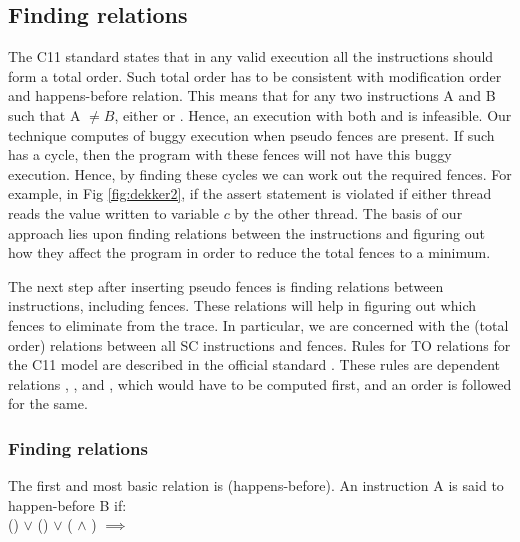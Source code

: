 \subsection{Finding relations}
The C11 standard \cite{c11} states that in any valid execution 
all the \mosc instructions should form a total order. Such total order
has to be consistent with modification order and 
happens-before relation. This means that for any two \mosc instructions A 
and B such that A $ \neq B $, either  or . 
Hence, an execution with both  and  is infeasible.
Our technique computes \setTO of buggy execution when pseudo fences are 
present. If such \setTO has a cycle, then the program with these fences 
will not have this buggy execution. 
Hence, by finding these cycles we can work out the required fences.
For example, in Fig \ref{fig:dekker2}, if the assert statement is violated
if either thread reads the value written to variable $c$ by the other thread.
The basis of our approach lies upon finding relations between the 
instructions and figuring out how they affect the program in order to 
reduce the total fences to a minimum. 

\par
The next step after inserting pseudo fences is finding relations between 
instructions, including fences. 
These relations will help in figuring out which fences to eliminate from 
the trace. In particular, we are concerned with the \setTO (total order) 
relations between all SC instructions and fences. Rules for TO relations 
for the C11 model are described in the official standard \cite{c11}. 
These rules are dependent relations \setSB, \setSW, \setHB and \setMO, which 
would have to be computed first, and an order is followed for the same.

\subsubsection{Finding \setHB relations}
The first and most basic relation is \setHB (happens-before). 
An instruction A is said to happen-before B if:\\
() $\lor$ () $\lor$ ( $\land$ ) $\implies$ 

